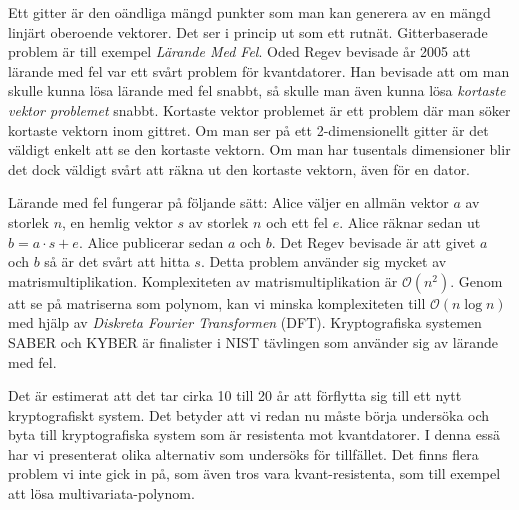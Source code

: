 \documentclass{paper}
\begin{document}
Ett gitter är den oändliga mängd punkter som man kan generera av en mängd
linjärt oberoende vektorer. Det ser i princip ut som ett rutnät. Gitterbaserade
problem är till exempel \textit{Lärande Med Fel}. Oded Regev bevisade år 2005
att lärande med fel var ett svårt problem för kvantdatorer. Han bevisade att om
man skulle kunna lösa lärande med fel snabbt, så skulle man även kunna lösa
\textit{kortaste vektor problemet} snabbt. Kortaste vektor problemet är ett
problem där man söker kortaste vektorn inom gittret. Om man ser på ett
2-dimensionellt gitter är det väldigt enkelt att se den kortaste vektorn. Om
man har tusentals dimensioner blir det dock väldigt svårt att räkna ut den
kortaste vektorn, även för en dator.

Lärande med fel fungerar på följande sätt: Alice väljer en allmän vektor $a$ av
storlek $n$, en hemlig vektor $s$ av storlek $n$ och ett fel $e$. Alice räknar
sedan ut $b = a \cdot s + e$. Alice publicerar sedan $a$ och $b$. Det Regev
bevisade är att givet $a$ och $b$ så är det svårt att hitta $s$. Detta problem
använder sig mycket av matrismultiplikation. Komplexiteten av
matrismultiplikation är $\mathcal{O}(n^2)$. Genom att se på matriserna som
polynom, kan vi minska komplexiteten till $\mathcal{O}(n \log n)$ med hjälp av
\textit{Diskreta Fourier Transformen} (DFT). Kryptografiska systemen SABER och
KYBER är finalister i NIST tävlingen som använder sig av lärande med fel.

Det är estimerat att det tar cirka 10 till 20 år att förflytta sig till ett
nytt kryptografiskt system. Det betyder att vi redan nu måste börja undersöka
och byta till kryptografiska system som är resistenta mot kvantdatorer. I denna
essä har vi presenterat olika alternativ som undersöks för tillfället. Det
finns flera problem vi inte gick in på, som även tros vara kvant-resistenta,
som till exempel att lösa multivariata-polynom.
\end{document}
